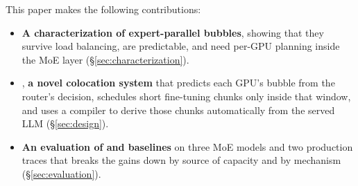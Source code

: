 %

This paper makes the following contributions:
\begin{itemize}
  \item \textbf{A characterization of expert-parallel bubbles}, showing that they survive
    load balancing, are predictable, and need per-GPU planning inside the \ac{MoE} layer (\S\ref{sec:characterization}).
  \item \sys, \textbf{a novel colocation system} that predicts each GPU’s bubble from the router’s decision, schedules short fine-tuning chunks only inside that window, and uses a compiler to derive those chunks automatically from the served \ac{LLM} (\S\ref{sec:design}).
  
  \item \textbf{An evaluation of \sys and baselines} on three \ac{MoE} models and two production traces that breaks the gains down by source of capacity and by mechanism (\S\ref{sec:evaluation}).
\end{itemize}
